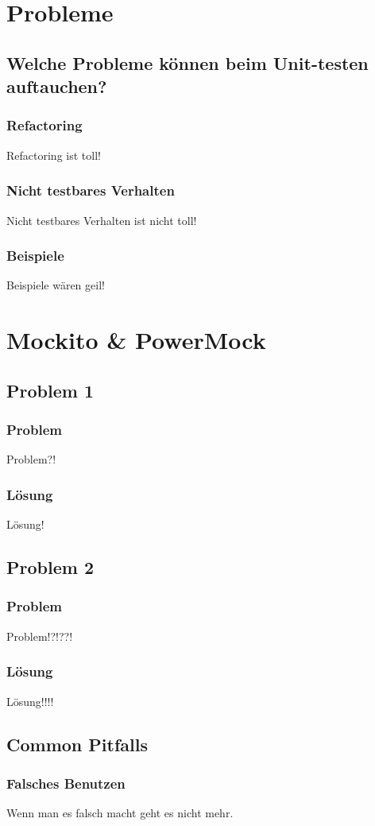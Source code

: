 \documentclass{beamer}
\begin{document}
	\section{Probleme}

		\subsection{Welche Probleme können beim Unit-testen auftauchen?}
		
			\begin{frame}
				\frametitle{Refactoring}
				Refactoring ist toll!
			\end{frame}

			\begin{frame}
				\frametitle{Nicht testbares Verhalten}
				Nicht testbares Verhalten ist nicht toll!
			\end{frame}

			\begin{frame}
				\frametitle{Beispiele}
				Beispiele wären geil!
			\end{frame}

	
	\section{Mockito \& PowerMock}


		\subsection{Problem 1}

			\begin{frame}
				\frametitle{Problem}
				Problem?! 
			\end{frame}

			\begin{frame}
				\frametitle{Lösung}
				Lösung!
			\end{frame}


		\subsection{Problem 2}

			\begin{frame}
				\frametitle{Problem}
				Problem!?!??!
			\end{frame}

			\begin{frame}
				\frametitle{Lösung}
				Lösung!!!!
			\end{frame}

		\subsection{Common Pitfalls}

			\begin{frame}
				\frametitle{Falsches Benutzen}
				Wenn man es falsch macht geht es nicht mehr.
			\end{frame}
\end{document}
